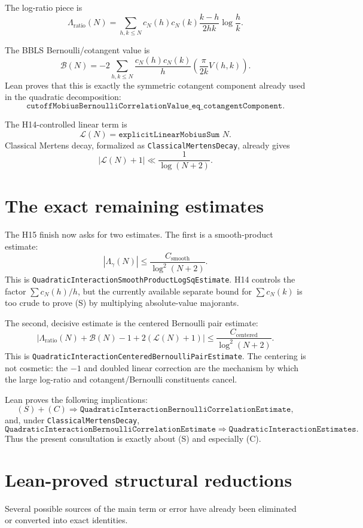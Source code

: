\documentclass[11pt]{article}
\newcommand{\B}{\mathcal{B}}
\newcommand{\Llin}{\mathcal{L}}
\newcommand{\Lg}{\Lambda_{\gamma}}
\newcommand{\Lr}{\Lambda_{\mathrm{ratio}}}
\begin{document}
The log-ratio piece is
\[
  \Lr(N)=
  \sum_{h,k\le N} c_N(h)c_N(k)
  \frac{k-h}{2hk}\log\frac hk.
\]

The BBLS Bernoulli/cotangent value is
\[
  \B(N)
  =
  -2\sum_{h,k\le N}
  \frac{c_N(h)c_N(k)}{h}
  \left(\frac{\pi}{2k}V(h,k)\right).
  \tag{2}
\]
Lean proves that this is exactly the symmetric cotangent component already used
in the quadratic decomposition:
\[
  \texttt{cutoffMobiusBernoulliCorrelationValue\_eq\_cotangentComponent}.
\]

The H14-controlled linear term is
\[
  \Llin(N)=\texttt{explicitLinearMobiusSum }N.
\]
Classical Mertens decay, formalized as
\texttt{ClassicalMertensDecay}, already gives
\[
  |\Llin(N)+1|\ll \frac1{\log(N+2)}.
\]

\section{The exact remaining estimates}

The H15 finish now asks for two estimates.  The first is a smooth-product
estimate:
\[
  |\Lg(N)|\le \frac{C_{\mathrm{smooth}}}{\log^2(N+2)}.
  \tag{S}
\]
This is \texttt{QuadraticInteractionSmoothProductLogSqEstimate}.  H14 controls
the factor $\sum c_N(h)/h$, but the currently available separate bound for
$\sum c_N(k)$ is too crude to prove (S) by multiplying absolute-value
majorants.

The second, decisive estimate is the centered Bernoulli pair estimate:
\[
  \left|
    \Lr(N)+\B(N)-1+2(\Llin(N)+1)
  \right|
  \le
  \frac{C_{\mathrm{centered}}}{\log^2(N+2)}.
  \tag{C}
\]
This is \texttt{QuadraticInteractionCenteredBernoulliPairEstimate}.  The
centering is not cosmetic: the $-1$ and doubled linear correction are the
mechanism by which the large log-ratio and cotangent/Bernoulli constituents
cancel.

Lean proves the following implications:
\[
  (S)+(C)
  \Longrightarrow
  \texttt{QuadraticInteractionBernoulliCorrelationEstimate},
\]
and, under \texttt{ClassicalMertensDecay},
\[
  \texttt{QuadraticInteractionBernoulliCorrelationEstimate}
  \Longrightarrow
  \texttt{QuadraticInteractionEstimates}.
  \tag{3}
\]
Thus the present consultation is exactly about (S) and especially (C).

\section{Lean-proved structural reductions}

Several possible sources of the main term or error have already been eliminated
or converted into exact identities.
\end{document}

